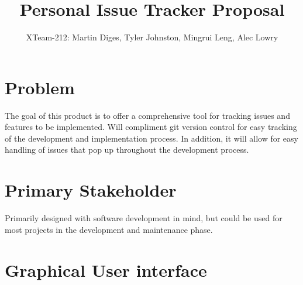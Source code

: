 \documentclass{article}
\title{Personal Issue Tracker Proposal}
\author{XTeam-212: Martin Diges, Tyler Johnston, Mingrui Leng, Alec Lowry}
\begin{document}
\maketitle
\tableofcontents
\newpage

\section{Problem}

The goal of this product is to offer a comprehensive tool for tracking issues and features to be implemented.
Will compliment git version control for easy tracking of the development and implementation process.
In addition, it will allow for easy handling of issues that pop up throughout the development process.

\section{Primary Stakeholder}

Primarily designed with software development in mind, but could be used for most projects in the development and maintenance phase.

\section{Graphical User interface}

\end{document}
